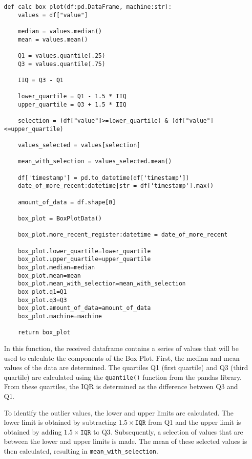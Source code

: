 \begin{verbatim}
def calc_box_plot(df:pd.DataFrame, machine:str):
    values = df["value"]

    median = values.median()
    mean = values.mean()

    Q1 = values.quantile(.25)
    Q3 = values.quantile(.75)

    IIQ = Q3 - Q1

    lower_quartile = Q1 - 1.5 * IIQ
    upper_quartile = Q3 + 1.5 * IIQ
    
    selection = (df["value"]>=lower_quartile) & (df["value"]<=upper_quartile)

    values_selected = values[selection]

    mean_with_selection = values_selected.mean()

    df['timestamp'] = pd.to_datetime(df['timestamp'])
    date_of_more_recent:datetime|str = df['timestamp'].max()

    amount_of_data = df.shape[0]

    box_plot = BoxPlotData()

    box_plot.more_recent_register:datetime = date_of_more_recent

    box_plot.lower_quartile=lower_quartile
    box_plot.upper_quartile=upper_quartile
    box_plot.median=median
    box_plot.mean=mean
    box_plot.mean_with_selection=mean_with_selection
    box_plot.q1=Q1
    box_plot.q3=Q3
    box_plot.amount_of_data=amount_of_data
    box_plot.machine=machine

    return box_plot
\end{verbatim}

In this function, the received dataframe contains a series of values that will be used to calculate the components of the Box Plot. First, the median and mean values of the data are determined. The quartiles Q1 (first quartile) and Q3 (third quartile) are calculated using the \texttt{quantile()} function from the pandas library. From these quartiles, the \gls{IQR} is determined as the difference between Q3 and Q1.

To identify the outlier values, the lower and upper limits are calculated. The lower limit is obtained by subtracting \(1.5 \times \texttt{IQR}\) from Q1 and the upper limit is obtained by adding \(1.5 \times \texttt{IQR}\) to Q3. Subsequently, a selection of values that are between the lower and upper limits is made. The mean of these selected values is then calculated, resulting in \texttt{mean\_with\_selection}.

